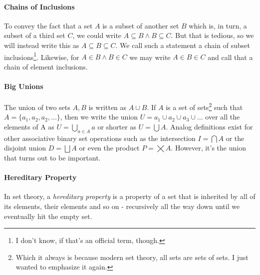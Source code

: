 

\paragraph{Chains of Inclusions}
To convey the fact that a set $A$ is a subset of another set $B$ which is, in turn, a subset of a third set $C$, we could write $A \subseteq B \wedge B \subseteq C$. But that is tedious, so we will instead write this as $A \subseteq B \subseteq C$. We call such a statement a chain of subset inclusions\footnote{I don't know, if that's an official term, though.}. Likewise, for $A \in B \wedge B \in C$ we may write $A \in B \in C$ and call that a chain of element inclusions.

\paragraph{Big Unions}
The union of two sets $A,B$ is written as $A \cup B$. If $A$ is a set of sets\footnote{Which it always is because modern set theory, all sets are sets of sets. I just wanted to emphasize it again.} such that $A = \{a_1, a_2, a_2, \ldots \}$, then we write the union $U = a_1 \cup a_2 \cup a_3 \cup \ldots$ over all the elements of A as $U = \bigcup_{a \in A} a$ or shorter as $U = \bigcup A$. Analog definitions exist for other associative binary set operations such as the intersection $I = \bigcap A$ or the disjoint union $D = \bigsqcup A$ or even the product $P = \bigtimes A$. However, it's the union that turns out to be important. 

\paragraph{Hereditary Property}
In set theory, a \emph{hereditary property} is a property of a set that is inherited by all of its elements, their elements and so on - recursively all the way down until we eventually hit the empty set.




